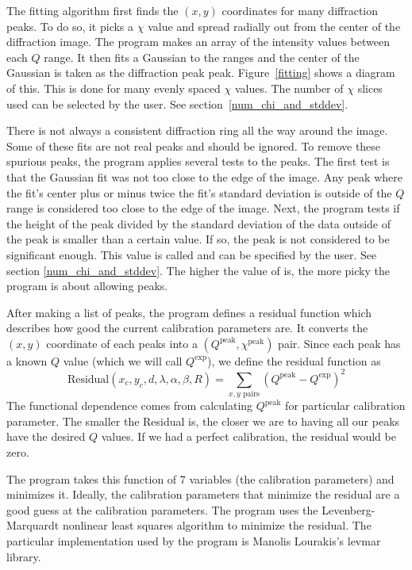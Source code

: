 The fitting algorithm first
finds the $(x,y)$ coordinates for many diffraction peaks. 
To do so, it picks a $\chi$ value and 
spread radially out from the center of the diffraction
image. The program makes an array of the intensity
values between each $Q$ range. It then fits a Gaussian to 
the ranges and the center of the Gaussian is taken as
the diffraction peak peak. Figure~\ref{fitting} shows
a diagram of this. This is done for many evenly spaced 
$\chi$ values. The number of $\chi$ slices used can
be selected by the user. See section~\ref{num_chi_and_stddev}.

There is not always a consistent diffraction ring 
all the way around the image. Some of these fits are
not real peaks and should be ignored. To remove these
spurious peaks, the program applies several tests
to the peaks. The first test is that the Gaussian fit was
not too close to the edge of the image. Any peak where
the fit's center plus or minus twice the fit's
standard deviation is outside of the $Q$ range is
considered too close to the edge of the image.
Next, the program tests if the height of the peak 
divided by the standard deviation of the data outside
of the peak is smaller than a certain value. If so,
the peak is not considered to be significant enough.
This value is called  and can be specified 
by the user. See section \ref{num_chi_and_stddev}.
The higher the value of  is, the
more picky the program is about allowing peaks. 

After making a list of peaks, the program defines a residual 
function which describes how good the current calibration
parameters are. It converts the $(x,y)$ coordinate
of each peaks into a $(Q^{\text{peak}},\chi^{\text{peak}})$ 
pair. Since each peak has a known $Q$ value (which we will 
call $Q^{\text{exp}}$), we define the residual function as
\begin{equation}\label{residual}
    \text{Residual}(x_c,y_c,d,\lambda,\alpha,\beta,R) =  
        \sum_{\text{$x,y$ pairs}}
        (Q^{\text{peak}} - Q^{\text{exp}})^2
\end{equation}
The functional dependence comes from
calculating $Q^{\text{peak}}$ for particular
calibration parameter.
The smaller the Residual is, the closer we are to
having all our peaks have the desired $Q$ values.
If we had a perfect calibration, the residual would
be zero. 

The program takes this function of 7 variables (the
calibration parameters) and minimizes it. 
Ideally, the calibration parameters that minimize the 
residual are a good guess at the calibration parameters.
The program uses the Levenberg-Marquardt nonlinear 
least squares algorithm to minimize the residual. 
The particular implementation used by the program
is Manolis Lourakis's
levmar library\cite{lourakis04LM}. 

